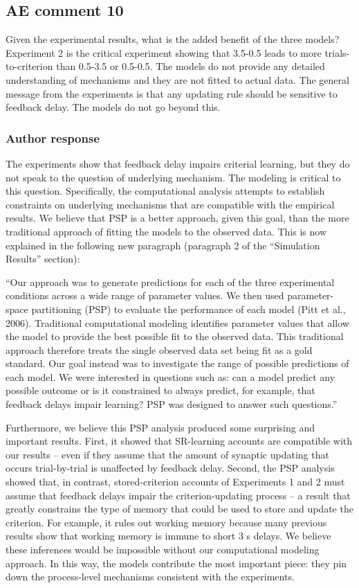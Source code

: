 \documentclass[12pt]{article}
\begin{document}
\subsection{AE comment 10}
Given the experimental results, what is the added benefit of
the three models? Experiment 2 is the critical experiment
showing that 3.5-0.5 leads to more trials-to-criterion than
0.5-3.5 or 0.5-0.5. The models do not provide any detailed
understanding of mechanisms and they are not fitted to
actual data. The general message from the experiments is
that any updating rule should be sensitive to feedback
delay. The models do not go beyond this.

\subsubsection{Author response}
The experiments show that feedback delay impairs criterial
learning, but they do not speak to the question of
underlying mechanism. The modeling is critical to this
question. Specifically, the computational analysis attempts
to establish constraints on underlying mechanisms that are
compatible with the empirical results. We believe that PSP
is a better approach, given this goal, than the more
traditional approach of fitting the models to the observed
data. This is now explained in the following new paragraph
(paragraph 2 of the ``Simulation Results'' section):

``Our approach was to generate predictions for each of the
three experimental conditions across a wide range of
parameter values. We then used parameter-space partitioning
(PSP) to evaluate the performance of each model (Pitt et
al., 2006). Traditional computational modeling identifies
parameter values that allow the model to provide the best
possible fit to the observed data. This traditional approach
therefore treats the single observed data set being fit as a
gold standard. Our goal instead was to investigate the range
of possible predictions of each model. We were interested in
questions such as: can a model predict any possible outcome
or is it constrained to always predict, for example, that
feedback delays impair learning? PSP was designed to answer
such questions.''

Furthermore, we believe this PSP analysis produced some
surprising and important results. First, it showed that
SR-learning accounts are compatible with our results -- even
if they assume that the amount of synaptic updating that
occurs trial-by-trial is unaffected by feedback delay.
Second, the PSP analysis showed that, in contrast,
stored-criterion accounts of Experiments 1 and 2 must assume
that feedback delays impair the criterion-updating process
-- a result that greatly constrains the type of memory that
could be used to store and update the criterion. For
example, it rules out working memory because many previous
results show that working memory is immune to short 3 s
delays. We believe these inferences would be impossible
without our computational modeling approach. In this way,
the models contribute the most important piece: they pin
down the process-level mechanisms consistent with the
experiments.
\end{document}
